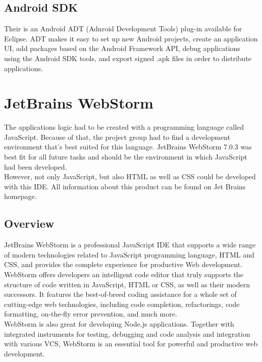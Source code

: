 \subsection{Android SDK}
Their is an Android ADT (Adnroid Development Tools) plug-in available for Eclipse. ADT makes it easy to set up new Android projects, create an application UI, add packages based on the Android Framework API, debug applications using the Android SDK tools, and export signed .apk files in order to distribute  applications.














\section{JetBrains WebStorm}
The applications logic had to be created with a programming language called JavaScript. Because of that, the project group had to find a development environment that's best suited for this language. JetBrains WebStorm 7.0.3 was best fit for all future tasks and should be the environment in which JavaScript had been developed. 
\\

However, not only JavaScript, but also HTML as well as CSS could be developed with this IDE. All information about this product can be found on Jet Brains homepage.\cite{webstorm}
\subsection{Overview}
JetBrains WebStorm is a professional JavaScript IDE that supports a wide range of modern technologies related to JavaScript programming language, HTML and  CSS, and provides the complete experience for productive Web development.
\\

WebStorm offers developers an intelligent code editor that truly supports the structure of code written in JavaScript, HTML or CSS, as well as their modern  successors. It features the best-of-breed coding assistance for a whole set of  cutting-edge web technologies, including code completion, refactorings, code formatting, on-the-fly error prevention, and much more. 
\\

WebStorm is also great for developing Node.js applications. Together with integrated instruments 
for testing, debugging and code analysis and integration with various VCS, WebStorm is an essential tool for powerful and productive web development.
\\

